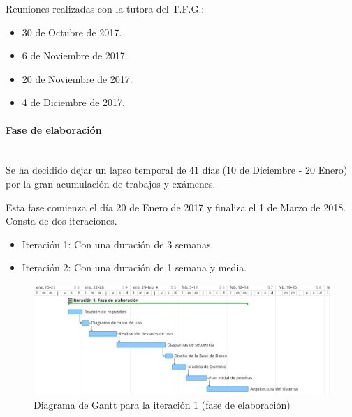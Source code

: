 \documentclass[twoside]{report}
\begin{document}
Reuniones realizadas con la tutora del T.F.G.:

\begin{itemize}
\item 30 de Octubre de 2017.
\item 6 de Noviembre de 2017.
\item 20 de Noviembre de 2017.
\item 4 de Diciembre de 2017.
\end{itemize}

\paragraph{Fase de elaboración}\mbox{}\\

Se ha decidido dejar un lapso temporal de 41 días (10 de Diciembre - 20 Enero) por la gran acumulación de trabajos y exámenes.

Esta fase comienza el día 20 de Enero de 2017 y finaliza el 1 de Marzo de 2018. Consta de dos iteraciones.

\begin{itemize}
\item Iteración 1: Con una duración de 3 semanas.
\item Iteración 2: Con una duración de 1 semana y media.
\end{itemize}

\begin{figure}[h]
\begin{center}
\includegraphics[width=\textwidth]{images/gantt/ite1}
\caption{Diagrama de Gantt para la iteración 1 (fase de elaboración)}
\end{center}
\end{figure}
\end{document}
